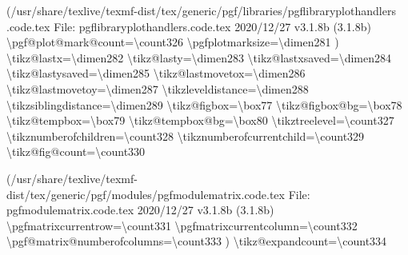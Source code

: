 \documentclass[
  letterpaper,
  DIV=11,
  numbers=noendperiod]{scrartcl}
\newenvironment{Shaded}{\begin{snugshade}}{\end{snugshade}}
\newcommand{\NormalTok}[1]{\textcolor[rgb]{0.00,0.23,0.31}{#1}}
\begin{document}
\begin{Shaded}
\begin{Highlighting}[]
\NormalTok{(/usr/share/texlive/texmf{-}dist/tex/generic/pgf/libraries/pgflibraryplothandlers}
\NormalTok{.code.tex}
\NormalTok{File: pgflibraryplothandlers.code.tex 2020/12/27 v3.1.8b (3.1.8b)}
\NormalTok{\textbackslash{}pgf@plot@mark@count=\textbackslash{}count326}
\NormalTok{\textbackslash{}pgfplotmarksize=\textbackslash{}dimen281}
\NormalTok{)}
\NormalTok{\textbackslash{}tikz@lastx=\textbackslash{}dimen282}
\NormalTok{\textbackslash{}tikz@lasty=\textbackslash{}dimen283}
\NormalTok{\textbackslash{}tikz@lastxsaved=\textbackslash{}dimen284}
\NormalTok{\textbackslash{}tikz@lastysaved=\textbackslash{}dimen285}
\NormalTok{\textbackslash{}tikz@lastmovetox=\textbackslash{}dimen286}
\NormalTok{\textbackslash{}tikz@lastmovetoy=\textbackslash{}dimen287}
\NormalTok{\textbackslash{}tikzleveldistance=\textbackslash{}dimen288}
\NormalTok{\textbackslash{}tikzsiblingdistance=\textbackslash{}dimen289}
\NormalTok{\textbackslash{}tikz@figbox=\textbackslash{}box77}
\NormalTok{\textbackslash{}tikz@figbox@bg=\textbackslash{}box78}
\NormalTok{\textbackslash{}tikz@tempbox=\textbackslash{}box79}
\NormalTok{\textbackslash{}tikz@tempbox@bg=\textbackslash{}box80}
\NormalTok{\textbackslash{}tikztreelevel=\textbackslash{}count327}
\NormalTok{\textbackslash{}tikznumberofchildren=\textbackslash{}count328}
\NormalTok{\textbackslash{}tikznumberofcurrentchild=\textbackslash{}count329}
\NormalTok{\textbackslash{}tikz@fig@count=\textbackslash{}count330}

\NormalTok{(/usr/share/texlive/texmf{-}dist/tex/generic/pgf/modules/pgfmodulematrix.code.tex}
\NormalTok{File: pgfmodulematrix.code.tex 2020/12/27 v3.1.8b (3.1.8b)}
\NormalTok{\textbackslash{}pgfmatrixcurrentrow=\textbackslash{}count331}
\NormalTok{\textbackslash{}pgfmatrixcurrentcolumn=\textbackslash{}count332}
\NormalTok{\textbackslash{}pgf@matrix@numberofcolumns=\textbackslash{}count333}
\NormalTok{)}
\NormalTok{\textbackslash{}tikz@expandcount=\textbackslash{}count334}


\end{Highlighting}
\end{Shaded}
\end{document}
